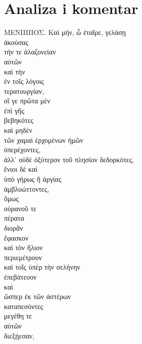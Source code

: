 \section*{Analiza i komentar}


{\large
\begin{greek}
\noindent ΜΕΝΙΠΠΟΣ. Καὶ μήν, ὦ ἑταῖρε, γελάσῃ \\
ἀκούσας \\
\tabto{2em} τήν τε ἀλαζονείαν \\
\tabto{4em} αὐτῶν \\

\tabto{2em} καὶ τὴν \\
\tabto{4em} ἐν τοῖς λόγοις \\
\tabto{2em} τερατουργίαν, \\
οἵ γε πρῶτα μὲν \\
\tabto{2em} ἐπὶ γῆς \\
βεβηκότες \\
καὶ μηδὲν \\
\tabto{2em} τῶν χαμαὶ ἐρχομένων ἡμῶν \\
ὑπερέχοντες, \\
ἀλλ' οὐδὲ ὀξύτερον τοῦ πλησίον δεδορκότες, \\
ἔνιοι δὲ καὶ \\
\tabto{2em} ὑπὸ γήρως ἢ ἀργίας \\
ἀμβλυώττοντες, \\
ὅμως \\
\tabto{4em} οὐρανοῦ τε \\
\tabto{2em} πέρατα \\
\tabto{2em} διορᾶν \\
ἔφασκον \\
καὶ τὸν ἥλιον \\
περιεμέτρουν \\
καὶ τοῖς ὑπὲρ τὴν σελήνην \\
ἐπεβάτευον \\
καὶ \\
\tabto{2em} ὥσπερ ἐκ τῶν ἀστέρων \\
καταπεσόντες \\
μεγέθη τε \\
\tabto{2em} αὐτῶν \\
διεξῄεσαν,\\

\end{greek}
}

